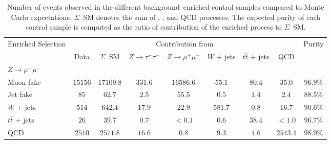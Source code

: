 %
\begin{table}
\begin{center}
\tablesize
\begin{tabular}{|l|c|c|c|c|c|c|c|c|}
\hline
\multirow{2}{17mm}{Enriched Selection} & \multicolumn{7}{c|}{Contribution from} & \multirow{2}{12mm}{Purity} \\
 & Data & $\Sigma$~SM & $Z \to \tau^{+} \tau^{-}$ & $Z \to \mu^{+} \mu^{-}$ & $W$ + jets & $t\bar{t}$ + jets & QCD & \\
\hline
\hline
$Z \to \mu^{+} \mu^{-}$ & & & & & & & & \\
\hspace{2mm} Muon fake & $15156$ & $17109.8$ & $331.6$ & $16586.6$ & $55.1$ & $80.4$ & $35.0$ & $96.9\%$ \\
\hspace{2mm} Jet fake & $85$ & $62.7$ & $2.5$ & $55.5$ & $0.5$ & $1.4$ & $2.4$ & $88.5\%$ \\
$W$ + jets & $514$ & $642.4$ & $17.9$ & $22.9$ & $581.7$ & $0.8$ & $16.7$ & $90.6\%$ \\  
$t\bar{t}$ + jets & $26$ & $39.7$ & $0.7$ & $< 0.1$ & $0.6$ & $38.4$ & $< 1.0$ & $96.7\%$ \\
QCD & $2510$ & $2571.8$ & $16.6$ & $0.8$ & $9.3$ & $1.6$ & $2543.4$ & $98.9\%$ \\
\hline
\end{tabular}
\caption[Comparison of background control region yields in data and the
prediction from simulation]{\captiontext 
         Number of events observed in the different background--enriched control
         samples compared to Monte Carlo expectations.  $\Sigma$~SM denotes the
         sum of \ZTT, \ZMM, \WpJets
         \ttbarpJets and QCD processes.  The expected purity of each
         control sample is computed as the ratio of contribution of the enriched
         process to $\Sigma$~SM.}
\label{tab:ResultsMuTauBgControlRegions}
\end{center}
\end{table}
%
